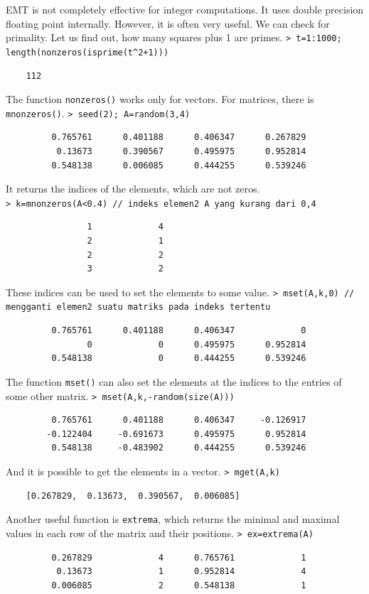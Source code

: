 \documentclass[11pt, a4paper]{article}
\newcommand{\emtcmd}[1]{\noindent\texttt{\textcolor{emtcommand}{>}\ #1}\par\smallskip}
\begin{document}
EMT is not completely effective for integer computations. It uses double precision floating point internally. However, it is often very useful. We can check for primality. Let us find out, how many squares plus 1 are primes.
\emtcmd{t=1:1000; length(nonzeros(isprime(t\^{}2+1)))}
\begin{verbatim}
    112
\end{verbatim}

The function \texttt{nonzeros()} works only for vectors. For matrices, there is \texttt{mnonzeros()}.
\emtcmd{seed(2); A=random(3,4)}
\begin{verbatim}
         0.765761      0.401188      0.406347      0.267829
          0.13673      0.390567      0.495975      0.952814
         0.548138      0.006085      0.444255      0.539246
\end{verbatim}

It returns the indices of the elements, which are not zeros.
\emtcmd{k=mnonzeros(A<0.4) \textcolor{emtcomment}{// indeks elemen2 A yang kurang dari 0,4}}
\begin{verbatim}
                1             4
                2             1
                2             2
                3             2
\end{verbatim}

These indices can be used to set the elements to some value.
\emtcmd{mset(A,k,0) \textcolor{emtcomment}{// mengganti elemen2 suatu matriks pada indeks tertentu}}
\begin{verbatim}
         0.765761      0.401188      0.406347             0
                0             0      0.495975      0.952814
         0.548138             0      0.444255      0.539246
\end{verbatim}

The function \texttt{mset()} can also set the elements at the indices to the entries of some other matrix.
\emtcmd{mset(A,k,-random(size(A)))}
\begin{verbatim}
         0.765761      0.401188      0.406347     -0.126917
        -0.122404     -0.691673      0.495975      0.952814
         0.548138     -0.483902      0.444255      0.539246
\end{verbatim}

And it is possible to get the elements in a vector.
\emtcmd{mget(A,k)}
\begin{verbatim}
    [0.267829,  0.13673,  0.390567,  0.006085]
\end{verbatim}

Another useful function is \texttt{extrema}, which returns the minimal and maximal values in each row of the matrix and their positions.
\emtcmd{ex=extrema(A)}
\begin{verbatim}
         0.267829             4      0.765761             1
          0.13673             1      0.952814             4
         0.006085             2      0.548138             1
\end{verbatim}
\end{document}
